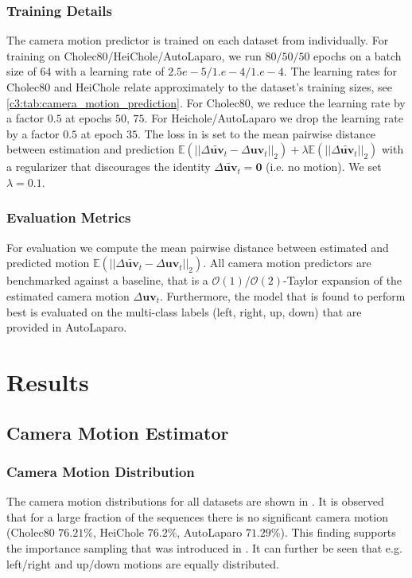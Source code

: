 \subsubsection{Training Details}
The camera motion predictor is trained on each dataset from  individually. For training on Cholec80/HeiChole/AutoLaparo, we run $80/50/50$ epochs on a batch size of $64$ with a learning rate of $2.5e-5/1.e-4/1.e-4$. The learning rates for Cholec80 and HeiChole relate approximately to the dataset's training sizes, see \ref{c3:tab:camera_motion_prediction}. For Cholec80, we reduce the learning rate by a factor $0.5$ at epochs $50,\,75$. For Heichole/AutoLaparo we drop the learning rate by a factor $0.5$ at epoch $35$. The loss in  is set to the mean pairwise distance between estimation and prediction $\mathbb{E}(||\Delta\tilde{\mathbf{uv}}_t - \Delta\mathbf{uv}_t||_2) + \lambda \mathbb{E}(||\Delta\tilde{\mathbf{uv}}_t||_2)$ with a regularizer that discourages the identity $\Delta\tilde{\mathbf{uv}}_t = \mathbf{0}$ (i.e. no motion). We set $\lambda = 0.1$.

\subsubsection{Evaluation Metrics}
For evaluation we compute the mean pairwise distance between estimated and predicted motion $\mathbb{E}(||\Delta\tilde{\mathbf{uv}}_t - \Delta\mathbf{uv}_t||_2)$. All camera motion predictors are benchmarked against a baseline, that is a $\mathcal{O}(1)$/$\mathcal{O}(2)$-Taylor expansion of the estimated camera motion $\Delta\mathbf{uv}_t$. Furthermore, the model that is found to perform best is evaluated on the multi-class labels (left, right, up, down) that are provided in AutoLaparo. 

\section{Results}
\subsection{Camera Motion Estimator}
\subsubsection{Camera Motion Distribution}
The camera motion distributions for all datasets are shown in . It is observed that for a large fraction of the sequences there is no significant camera motion (Cholec80 $76.21\%$, HeiChole $76.2\%$, AutoLaparo $71.29\%$). This finding supports the importance sampling that was introduced in . It can further be seen that e.g. left/right and up/down motions are equally distributed.

